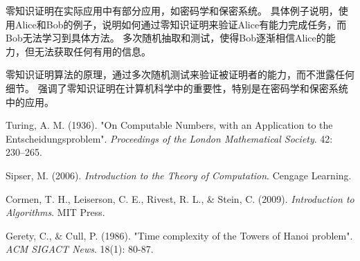 \documentclass[UTF-8,a4paper,9pt]{article}
\begin{document}
零知识证明在实际应用中有部分应用，如密码学和保密系统。
具体例子说明，使用Alice和Bob的例子，说明如何通过零知识证明来验证Alice有能力完成任务，而Bob无法学习到具体方法。
多次随机抽取和测试，使得Bob逐渐相信Alice的能力，但无法获取任何有用的信息。

零知识证明算法的原理，通过多次随机测试来验证被证明者的能力，而不泄露任何细节。
强调了零知识证明在计算机科学中的重要性，特别是在密码学和保密系统中的应用。

\begin{thebibliography}{9}

   Turing, A. M. (1936). "On Computable Numbers, with an Application to the Entscheidungsproblem". \textit{Proceedings of the London Mathematical Society}. 42: 230–265.

   Sipser, M. (2006). \textit{Introduction to the Theory of Computation}. Cengage Learning.

   Cormen, T. H., Leiserson, C. E., Rivest, R. L., \& Stein, C. (2009). \textit{Introduction to Algorithms}. MIT Press.

   Gerety, C., \& Cull, P. (1986). "Time complexity of the Towers of Hanoi problem". \textit{ACM SIGACT News}. 18(1): 80-87.

\end{thebibliography}
\end{document}
